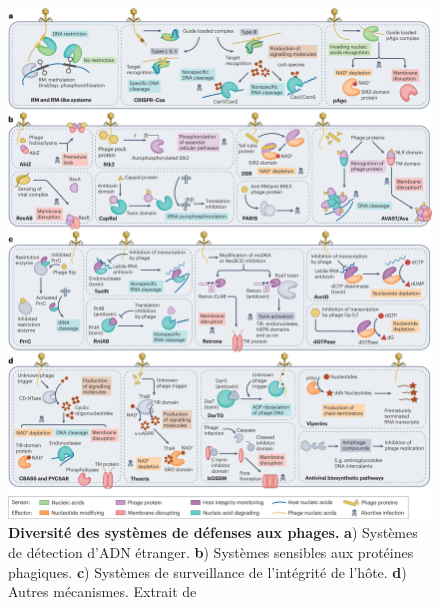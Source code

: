 \begin{figure}[htbp]
    \centering
    \includegraphics[width=\textwidth]{images/defensesys.png}
    \caption[Diversité des systèmes de défenses aux phages]{\textbf{Diversité des systèmes de défenses aux phages.} \textbf{a}) Systèmes de détection d'ADN étranger. \textbf{b}) Systèmes sensibles aux protéines phagiques. \textbf{c}) Systèmes de surveillance de l'intégrité de l'hôte. \textbf{d}) Autres mécanismes.  Extrait de \cite{georjon_highly_2023}}
    \label{fig:defsys}
\end{figure}

\newpage


